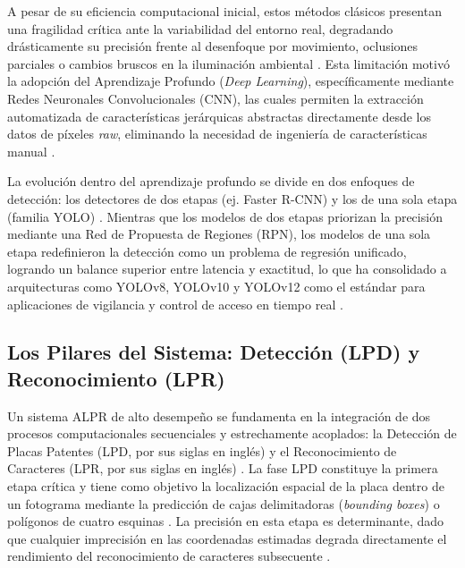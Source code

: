 A pesar de su eficiencia computacional inicial, estos métodos clásicos presentan una 
fragilidad crítica ante la variabilidad del entorno real, degradando drásticamente su 
precisión frente al desenfoque por movimiento, oclusiones parciales o cambios bruscos 
en la iluminación ambiental 
\parencite{meesadAdvancedDeepLearning2025a, sonnaraEfficientRealtimeLicense2025, 
vargooraniLicensePlateDetection2024}. 
Esta limitación motivó la adopción del Aprendizaje Profundo (\textit{Deep Learning}), 
específicamente mediante Redes Neuronales Convolucionales (CNN), las cuales permiten 
la extracción automatizada de características jerárquicas abstractas directamente desde 
los datos de píxeles \textit{raw}, eliminando la necesidad de ingeniería de 
características manual 
\parencite{PDFRealTimeLicense2026, swatiEfficientDeepLearning2024, 
xuDeepLearningAlgorithms2026c}.

La evolución dentro del aprendizaje profundo se divide en dos enfoques de detección: 
los detectores de dos etapas (ej. Faster R-CNN) y los de una sola etapa (familia YOLO) 
\parencite{PDFRealTimeLicense2026, swatiEfficientDeepLearning2024}. 
Mientras que los modelos de dos etapas priorizan la precisión mediante una Red de 
Propuesta de Regiones (RPN), los modelos de una sola etapa redefinieron la detección 
como un problema de regresión unificado, logrando un balance superior entre latencia 
y exactitud, lo que ha consolidado a arquitecturas como YOLOv8, YOLOv10 y YOLOv12 
como el estándar para aplicaciones de vigilancia y control de acceso en tiempo real 
\parencite{buleuDeepLearningBasedSystem2025a, mobeenRealTimeAutomaticLicense2026, 
sonnaraEfficientRealtimeLicense2025}.

\subsection{Los Pilares del Sistema: Detección (LPD) y Reconocimiento (LPR)}

Un sistema ALPR de alto desempeño se fundamenta en la integración de dos procesos 
computacionales secuenciales y estrechamente acoplados: la Detección de Placas Patentes 
(LPD, por sus siglas en inglés) y el Reconocimiento de Caracteres (LPR, por sus siglas 
en inglés) 
\parencite{larocaAdvancingMultinationalLicense2025, sonnaraEfficientRealtimeLicense2025}. 
La fase LPD constituye la primera etapa crítica y tiene como objetivo la localización 
espacial de la placa dentro de un fotograma mediante la predicción de cajas delimitadoras 
(\textit{bounding boxes}) o polígonos de cuatro esquinas 
\parencite{buleuDeepLearningBasedSystem2025a, sonnaraEfficientRealtimeLicense2025, 
vargooraniLicensePlateDetection2024}. 
La precisión en esta etapa es determinante, dado que cualquier imprecisión en las 
coordenadas estimadas degrada directamente el rendimiento del reconocimiento de 
caracteres subsecuente 
\parencite{suhartoComparativeEvaluationYOLObased2025, swatiEfficientDeepLearning2024, 
xuDeepLearningAlgorithms2026c}.

